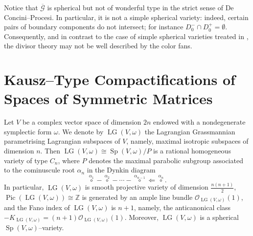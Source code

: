 \documentclass[10pt]{amsart}
\theoremstyle{definition}
\newtheorem{remark}[theorem]{Remark}
\newcommand{\Z}{\mathbb{Z}}
\newcommand{\OO}{\mathcal{O}}
\newcommand{\Pic}{\operatorname{Pic}}
\newcommand{\LG}{\operatorname{LG}}
\DeclareMathOperator{\Sp}{Sp}
\theoremstyle{plain} %
\begin{document}
Notice that $\overline{\mathscr G}$ is spherical but not of wonderful type in the strict sense of De Concini--Procesi. In particular, it is not a simple spherical variety: indeed, certain pairs of boundary components do not intersect; for instance $D_0^-\cap D_0^+ = \emptyset$.
Consequently, and in contrast to the case of simple spherical varieties treated in \cite{Br2}, the divisor theory may not be well described by the color fans.







\section{Kausz--Type Compactifications of Spaces of Symmetric Matrices}\label{Sec2}

Let $V$ be a complex vector space of dimension $2n$ endowed with a nondegenerate symplectic form $\omega$. We denote by $\LG(V,\omega)$ the Lagrangian Grassmannian parametrising Lagrangian subspaces of $V$, namely, maximal isotropic subspaces of dimension $n$. Then $\LG(V,\omega) \cong \Sp(V,\omega)/P$ is a rational homogeneous variety of type $C_n$, where $P$ denotes the maximal parabolic subgroup associated to the cominuscule root $\alpha_n$ in the Dynkin diagram
\[
\overset{\alpha_1}{\circ}-\overset{\alpha_2}{\circ}-\cdots-
\overset{\alpha_{n-1}}{\circ}\Leftarrow\overset{\alpha_n}{\circ}.
\]
In particular, $\LG(V,\omega)$ is smooth projective variety of dimension $\frac{n(n+1)}{2}$, $\Pic(\LG(V,\omega))\cong \Z$ is generated by an ample line bundle $\OO_{\LG(V,\omega)}(1)$, and the Fano index of $\LG(V,\omega)$ is $n+1$, namely, the anticanonical class  \(  -K_{\LG(V,\omega)}=(n+1)\OO_{\LG(V,\omega)}(1)\).
Moreover, $\LG(V,\omega)$ is  a spherical $\Sp(V,\omega)$--variety.
\end{document}
